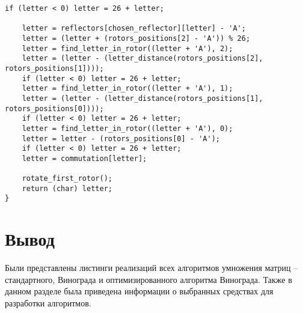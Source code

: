 \begin{center}
    \captionsetup{justification=raggedright,singlelinecheck=off}
    \begin{lstlisting}[label=lst:enigma2,caption=Реализация алгоритма шифрования машины <<Энигма>>]
    if (letter < 0) letter = 26 + letter;

    letter = reflectors[chosen_reflector][letter] - 'A';
    letter = (letter + (rotors_positions[2] - 'A')) % 26;
    letter = find_letter_in_rotor((letter + 'A'), 2);
    letter = (letter - (letter_distance(rotors_positions[2], rotors_positions[1])));
    if (letter < 0) letter = 26 + letter;
    letter = find_letter_in_rotor((letter + 'A'), 1);
    letter = (letter - (letter_distance(rotors_positions[1], rotors_positions[0])));
    if (letter < 0) letter = 26 + letter;
    letter = find_letter_in_rotor((letter + 'A'), 0);
    letter = letter - (rotors_positions[0] - 'A');
    if (letter < 0) letter = 26 + letter;
    letter = commutation[letter];

    rotate_first_rotor();
    return (char) letter;
}
\end{lstlisting}
\end{center}


\section*{Вывод}

Были представлены листинги реализаций всех алгоритмов умножения матриц -- стандартного, Винограда и оптимизированного алгоритма Винограда. Также в данном разделе была приведена информации о выбранных средствах для разработки алгоритмов.
